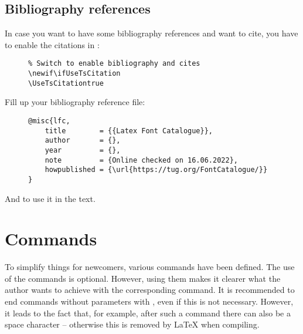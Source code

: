 \subsection{Bibliography references}\label{subsec:Bibliography references}

In case you want to have some bibliography references and want to cite, you
have to enable the citations in :

\begin{figure}[H]
    \small
    \centering
    \begin{BVerbatim}
\newif\ifUseTsCitation
\UseTsCitationtrue
    \end{BVerbatim}
\end{figure}

Fill up your bibliography reference file:

\begin{figure}[H]
    \small
    \centering
    \begin{BVerbatim}
@misc{lfc,
    title        = {{Latex Font Catalogue}},
    author       = {},
    year         = {},
    note         = {Online checked on 16.06.2022},
    howpublished = {\url{https://tug.org/FontCatalogue/}}
}
    \end{BVerbatim}
\end{figure}

And to use it in the text.

\section{Commands}
\label{sec:Commands}

To simplify things for newcomers, various commands have been defined. The use
of the commands is optional. However, using them makes it clearer what the
author wants to achieve with the corresponding command. It is recommended to
end commands without parameters with \tsTextMonospace{\{\}}, even if this is
not necessary. However, it leads to the fact that, for example, after such a
command there can also be a space character -- otherwise this is removed by
\LaTeX{} when compiling.


